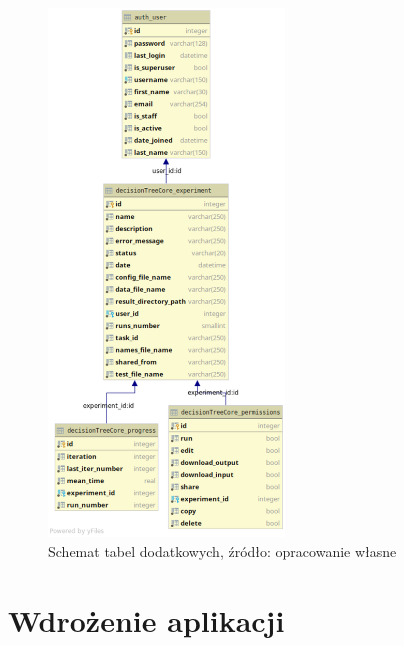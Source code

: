  
\begin{figure}[htb]
	\centering
	\includegraphics[height=14cm]{grafika/database_schema_2.eps}
	\caption{Schemat tabel dodatkowych, źródło: opracowanie własne}
	\label{rys6_database_schema}
\end{figure}

\section{Wdrożenie aplikacji}
